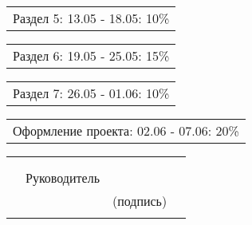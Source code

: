 \documentclass[12pt, А4, twoside]{article}
\begin{document}
\begin{FlushLeft}
    \vspace{-0.1 cm}

    \begin{tabular}{p{17.25cm}} 
        \hspace{0.3cm} \textsf{Раздел 5:} \hspace{2.54cm} \textsf{ 13.05 - 18.05:} \hspace{0.5cm} \textsf{10\%} \vspace{0pt} \hline \\
    \end{tabular} 

    \vspace{-0.1 cm}

    \begin{tabular}{p{17.25cm}} 
        \hspace{0.3cm} \textsf{Раздел 6:} \hspace{2.54cm} \textsf{ 19.05 - 25.05:} \hspace{0.5cm} \textsf{15\%} \vspace{0pt} \hline \\
    \end{tabular} 

    \vspace{-0.1 cm}

    \begin{tabular}{p{17.25cm}} 
        \hspace{0.3cm} \textsf{Раздел 7:} \hspace{2.54cm} \textsf{ 26.05 - 01.06:} \hspace{0.5cm} \textsf{10\%} \vspace{0pt} \hline \\
    \end{tabular} 

    \vspace{-0.1 cm}
    
    \begin{tabular}{p{17.25cm}} 
        \hspace{0.3cm} \textsf{Оформление проекта:} \hspace{0.5cm} \textsf{ 02.06 - 07.06:} \hspace{0.5cm} \textsf{20\%} \vspace{0pt} \hline \\
    \end{tabular} 

    \begin{tabular}{p{4.2cm} p{3.8cm} p{6.0cm} p{2.0cm}} 
        & & & 
        \\ 
        & & & 
        \\
        & \fontsize{14}{17.5} \textsf{Руководитель} & 
        \vspace{0pt} \hline & 
        \\ 
        & & \centering \fontsize{12}{15} \textsf{(подпись)} & 
        \\ 
        & & &
    \end{tabular} 


\end{FlushLeft}
\end{document}
